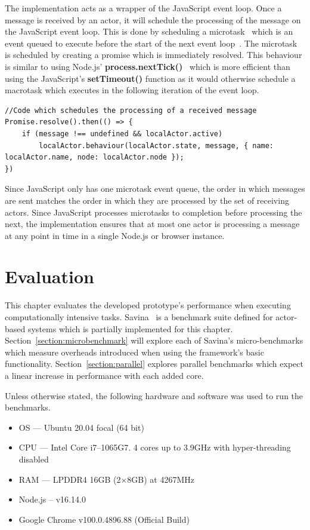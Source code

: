 \documentclass[oneside]{um-fict}
\begin{document}
The implementation acts as a wrapper of the JavaScript event loop. Once a message is received by an actor, it will schedule the processing of the message on the JavaScript event loop. This is done by scheduling a microtask~\cite{microtasks} which is an event queued to execute before the start of the next event loop~\cite{eventloopbrowser}\cite{eventloopnode}. The microtask is scheduled by creating a promise which is immediately resolved. This behaviour is similar to using Node.js' \textbf{process.nextTick()}~\cite{nexttick} which is more efficient than using the JavaScript's \textbf{setTimeout()} function as it would otherwise schedule a macrotask which executes in the following iteration of the event loop.
\begin{lstlisting}
//Code which schedules the processing of a received message
Promise.resolve().then(() => {
    if (message !== undefined && localActor.active)
        localActor.behaviour(localActor.state, message, { name: localActor.name, node: localActor.node });
})
\end{lstlisting}

Since JavaScript only has one microtask event queue, the order in which messages are sent matches the order in which they are processed by the set of receiving actors. Since JavaScript processes microtasks to completion before processing the next, the implementation ensures that at most one actor is processing a message at any point in time in a single Node.js or browser instance.

\chapter{Evaluation}\label{chap:evaluation}
This chapter evaluates the developed prototype's performance when executing computationally intensive tasks. Savina~\cite{savina} is a benchmark suite defined for actor-based systems which is partially implemented for this chapter. Section~\ref{section:microbenchmark} will explore each of Savina's micro-benchmarks which measure overheads introduced when using the framework's basic functionality. Section~\ref{section:parallel} explores parallel benchmarks which expect a linear increase in performance with each added core. 

Unless otherwise stated, the following hardware and software was used to run the benchmarks.
\begin{itemize}
    \item OS --- Ubuntu 20.04 focal (64 bit)
    \item CPU --- Intel Core i7--1065G7. 4 cores up to 3.9GHz with hyper-threading disabled
    \item RAM --- LPDDR4 16GB (2$\times$8GB) at 4267MHz
    \item Node.js – v16.14.0
    \item Google Chrome v100.0.4896.88 (Official Build)
\end{itemize}
\end{document}
